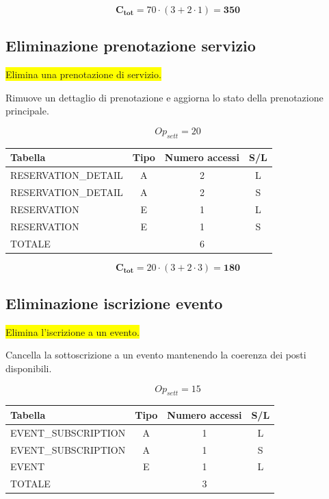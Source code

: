 \documentclass[a4paper,12pt]{report}
\begin{document}
$$\mathbf{C_{tot}} = 70 \cdot (3 + 2 \cdot 1) = \mathbf{350}$$

\subsection*{Eliminazione prenotazione servizio} \label{op16}
\colorbox{yellow}{Elimina una prenotazione di servizio.}

Rimuove un dettaglio di prenotazione e aggiorna lo stato della
prenotazione principale.

$$Op_{sett} = 20$$

\begin{table}[H]
  \centering
  \small
  \renewcommand{\arraystretch}{1.15}
  \begin{tabularx}{0.8\textwidth}{|X|c|c|c|}
    \hline
    \rowcolor{gray!20}
    \textbf{Tabella} & \textbf{Tipo} & \textbf{Numero accessi} & \textbf{S/L} \\
    \hline
    RESERVATION\_DETAIL & A & 2 & L \\
    RESERVATION\_DETAIL & A & 2 & S \\
    RESERVATION & E & 1 & L \\
    RESERVATION & E & 1 & S \\
    \hline
    \rowcolor{gray!20}
    TOTALE & & 6 & \\
    \hline
  \end{tabularx}
  \vspace{-1em}
\end{table}

$$\mathbf{C_{tot}} = 20 \cdot (3 + 2 \cdot 3) = \mathbf{180}$$

\subsection*{Eliminazione iscrizione evento} \label{op17}
\colorbox{yellow}{Elimina l'iscrizione a un evento.}

Cancella la sottoscrizione a un evento mantenendo la coerenza dei
posti disponibili.

$$Op_{sett} = 15$$

\begin{table}[H]
  \centering
  \small
  \renewcommand{\arraystretch}{1.15}
  \begin{tabularx}{0.8\textwidth}{|X|c|c|c|}
    \hline
    \rowcolor{gray!20}
    \textbf{Tabella} & \textbf{Tipo} & \textbf{Numero accessi} & \textbf{S/L} \\
    \hline
    EVENT\_SUBSCRIPTION & A & 1 & L \\
    EVENT\_SUBSCRIPTION & A & 1 & S \\
    EVENT & E & 1 & L \\
    \hline
    \rowcolor{gray!20}
    TOTALE & & 3 & \\
    \hline
  \end{tabularx}
  \vspace{-1em}
\end{table}
\end{document}
